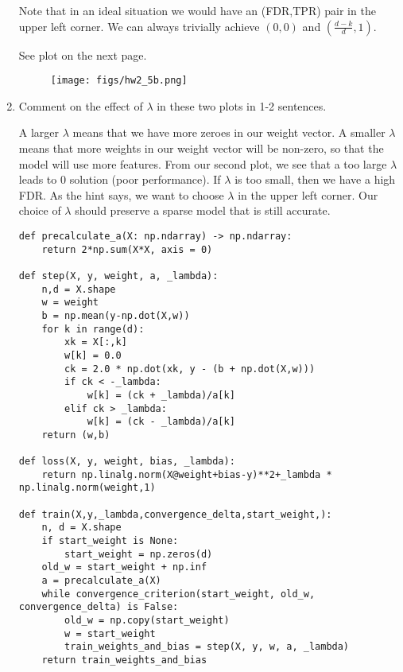 \documentclass{article}
\begin{document}
\begin{aprob}
\begin{enumerate}
        Note that in an ideal situation we would have an (FDR,TPR) pair in the upper left corner. We can always trivially achieve $(0,0)$ and $(\tfrac{d-k}{d},1)$.
          
          See plot on the next page.
          
        \begin{figure}[htp] 
        \centering
        \vspace*{-0.1in}
        \texttt{[image: figs/hw2\_5b.png]}
        \label{figs:hw2_5b.png}
        \end{figure}
        
        \item {} Comment on the effect of $\lambda$ in these two plots in 1-2 sentences.
        
        A larger $\lambda$ means that we have more zeroes in our weight vector. A smaller $\lambda$ means that more weights in our weight vector will be non-zero, so that the model will use more features. From our second plot, we see that a too large $\lambda$ leads to 0 solution (poor performance). If $\lambda$ is too small, then we have a high FDR. As the hint says, we want to choose $\lambda$ in the upper left corner. Our choice of $\lambda$ should preserve a sparse model that is still accurate.
    
    \begin{lstlisting}
def precalculate_a(X: np.ndarray) -> np.ndarray:
    return 2*np.sum(X*X, axis = 0)

def step(X, y, weight, a, _lambda):
    n,d = X.shape
    w = weight
    b = np.mean(y-np.dot(X,w))
    for k in range(d):
        xk = X[:,k]
        w[k] = 0.0
        ck = 2.0 * np.dot(xk, y - (b + np.dot(X,w)))
        if ck < -_lambda:
            w[k] = (ck + _lambda)/a[k]
        elif ck > _lambda:
            w[k] = (ck - _lambda)/a[k]
    return (w,b)

def loss(X, y, weight, bias, _lambda):
    return np.linalg.norm(X@weight+bias-y)**2+_lambda * np.linalg.norm(weight,1)

def train(X,y,_lambda,convergence_delta,start_weight,):
    n, d = X.shape
    if start_weight is None:
        start_weight = np.zeros(d)
    old_w = start_weight + np.inf 
    a = precalculate_a(X)
    while convergence_criterion(start_weight, old_w, convergence_delta) is False:
        old_w = np.copy(start_weight)
        w = start_weight
        train_weights_and_bias = step(X, y, w, a, _lambda)
    return train_weights_and_bias


\end{lstlisting}
\end{enumerate}
\end{aprob}
\end{document}
